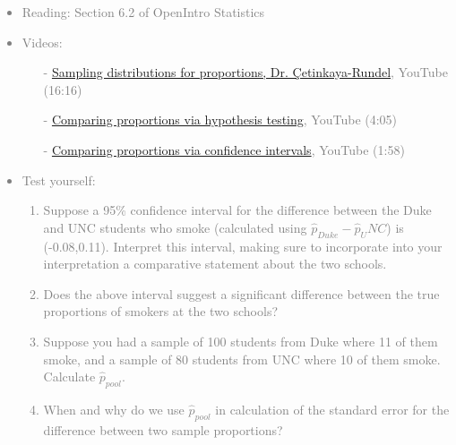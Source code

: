 \documentclass[11pt]{article}
\newcommand{\gray}[1]{\textcolor{gray}{#1}}
\begin{document}
\gray{
{\it
\vspace{-0.55cm}
\begin{itemize}
\renewcommand{\labelitemi}{{\textcolor{dark}{$\ast$}}}
\item Reading: Section 6.2 of OpenIntro Statistics
\item Videos:
\begin{itemize}
\item[-] \href{http://www.youtube.com/watch?v=_iFAZgpWsx0}{Sampling distributions for proportions, Dr. \c{C}etinkaya-Rundel}, YouTube (16:16)
\item[-] \href{http://www.youtube.com/watch?v=QaEjRSVG02E}{Comparing proportions via hypothesis testing}, YouTube (4:05)
\item[-] \href{http://www.youtube.com/watch?v=eAtCf0dM_VI}{Comparing proportions via confidence intervals}, YouTube (1:58)
\end{itemize}
\item Test yourself:
\begin{enumerate}
\item Suppose a 95\% confidence interval for the difference between the Duke and UNC students who smoke (calculated using $\hat{p}_{Duke} - \hat{p}_UNC$) is (-0.08,0.11). Interpret this interval, making sure to incorporate into your interpretation a comparative statement about the two schools.
\item Does the above interval suggest a significant difference between the true proportions of smokers at the two schools?
\item Suppose you had a sample of 100 students from Duke where 11 of them smoke, and a sample of 80 students from UNC where 10 of them smoke. Calculate $\hat{p}_{pool}$.
\item When and why do we use $\hat{p}_{pool}$ in calculation of the standard error for the difference between two sample proportions?
\end{enumerate}
\end{itemize}
}}


%

\vspace{0.48cm}

%
\end{document}
